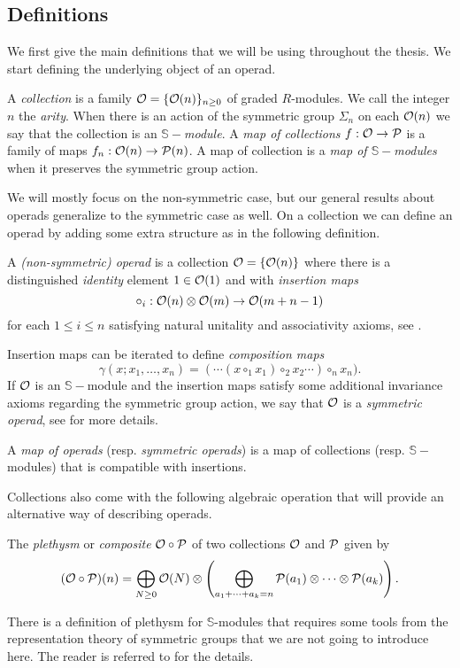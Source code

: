 \documentclass[Thesis.tex]{subfiles}
\begin{document}
\subsection{Definitions}
We first give the main definitions that we will be using throughout the thesis. We start defining the underlying object of an operad.

\begin{defin}\label{collections}
A \emph{collection} is a family ${\mathcal O}=\{{\mathcal O}(n)\}_{n\geq 0}$ of graded $R$-modules. We call the integer $n$ the \emph{arity}. When there is an action of the symmetric group $\Sigma_n$ on each ${\mathcal O}(n)$ we say that the collection is an \emph{$\mathbb{S}-$module}. A \emph{map of collections} $f:{\mathcal O}\to\mathcal{P}$ is a family of maps $f_n:{\mathcal O}(n)\to\mathcal{P}(n)$. A map of collection is a \emph{map of $\mathbb{S}-$modules} when it preserves the symmetric group action.
\end{defin}

We will mostly focus on the non-symmetric case, but our general results about operads generalize to the symmetric case as well. On a collection we can define an operad by adding some extra structure as in the following definition.

\begin{defin}
A \emph{(non-symmetric) operad} is a collection ${\mathcal O}=\{{\mathcal O}(n)\}$ where there is a distinguished \emph{identity} element $1\in{\mathcal O}(1)$ and with \emph{insertion maps} 
\[\circ_i:{\mathcal O}(n)\otimes {\mathcal O}(m)\to {\mathcal O}(m+n-1)\]
for each $1\leq i\leq n$ satisfying natural unitality and associativity axioms, see \cite[\S 1.1.2]{ward}. 

Insertion maps can be iterated to define \emph{composition maps} \[\gamma(x;x_1,\dots, x_n)=(\cdots(x\circ_1 x_1)\circ_2 x_2\cdots
)\circ_n x_n).\]
If ${\mathcal O}$ is an $\mathbb{S}-$module and the insertion maps satisfy some additional invariance axioms regarding the symmetric group action, we say that ${\mathcal O}$ is a \emph{symmetric operad}, see \cite{lodayvallette} for more details.

A \emph{map of operads} (resp. \emph{symmetric operads}) is a map of collections (resp. $\mathbb{S}-$modules) that is compatible with insertions.
\end{defin}

Collections also come with the following algebraic operation that will provide an alternative way of describing operads.
\begin{defin}
The \emph{plethysm} or \emph{composite} ${\mathcal O}\circ\mathcal{P}$ of two collections ${\mathcal O}$ and $\mathcal{P}$ given by
\[({\mathcal O}\circ\mathcal{P})(n)=\bigoplus_{N\geq 0}{\mathcal O}(N)\otimes \left(\bigoplus_{a_1+\cdots+a_k=n} \mathcal{P}(a_1)\otimes\cdots\otimes \mathcal{P}(a_k)\right).\]
\end{defin}
There is a definition of plethysm for $\mathbb{S}$-modules that requires some tools from the representation theory of symmetric groups that we are not going to introduce here. The reader is referred to \cite{lodayvallette} for the details. 
\end{document}
